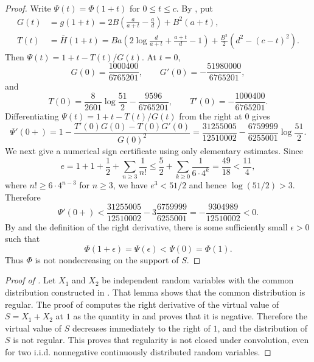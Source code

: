 \documentclass[11pt]{article}
\begin{document}
\begin{proof}
Write $\Psi(t)=\Phi(1+t)$ for $0\leq t\leq c$.  By
, put
\begin{equation}
\label{eq:G-and-T}
\begin{aligned}
G(t)&=g(1+t)
 =
2B\left(\frac{a}{a+t}-\frac{a}{d}\right)+B^2(a+t),\\
T(t)&=\overline H(1+t)
 =
Ba\left(2\log\frac{d}{a+t}+\frac{a+t}{d}-1\right)
+\frac{B^2}{2}\left(d^2-(c-t)^2\right).
\end{aligned}
\end{equation}
Then $\Psi(t)=1+t-T(t)/G(t)$.  At $t=0$,
\[
G(0)=\frac{1000400}{6765201},
\qquad
G'(0)=-\frac{51980000}{6765201},
\]
and
\[
T(0)=\frac{8}{2601}\log\frac{51}{2}-\frac{9596}{6765201},
\qquad
T'(0)=-\frac{1000400}{6765201}.
\]
Differentiating $\Psi(t)=1+t-T(t)/G(t)$ from the right at $0$ gives
\begin{equation}
\label{eq:slope-value}
\Psi'(0+)
=1-\frac{T'(0)G(0)-T(0)G'(0)}{G(0)^2}
=
\frac{31255005}{12510002}
-\frac{6759999}{6255001}\log\frac{51}{2}.
\end{equation}
We next give a numerical sign certificate using only elementary estimates.
Since
\[
e=1+1+\frac{1}{2}+\sum_{n\geq 3}\frac{1}{n!}
\leq
\frac{5}{2}+\sum_{k\geq 0}\frac{1}{6\cdot 4^k}
=\frac{49}{18}
<\frac{11}{4},
\]
where $n!\geq 6\cdot 4^{n-3}$ for $n\geq 3$, we have $e^3<51/2$ and hence
$\log(51/2)>3$.  Therefore
\[
\Psi'(0+)
<
\frac{31255005}{12510002}
-3\frac{6759999}{6255001}
=
-\frac{9304989}{12510002}
<0.
\]
By  and the definition of the right derivative, there is
some sufficiently small
$\epsilon>0$ such that
\[
\Phi(1+\epsilon)=\Psi(\epsilon)<\Psi(0)=\Phi(1).
\]
Thus $\Phi$ is not nondecreasing on the support of $S$.
\end{proof}

\begin{proof}[Proof of ]
Let $X_1$ and $X_2$ be independent random variables with the common distribution
constructed in .  That lemma shows that the common
distribution is regular.  The proof of 
computes the right derivative of the virtual value of $S=X_1+X_2$ at $1$ as
the quantity in  and proves that it is negative.
Therefore the virtual value of $S$ decreases immediately to the right of $1$,
and the distribution of $S$ is not regular.  This proves that regularity is not
closed under convolution, even for two i.i.d. nonnegative continuously
distributed random variables.
\end{proof}



\end{document}
